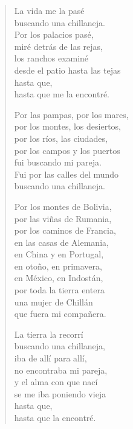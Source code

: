 \documentclass[12pt]{article}
\begin{document}
\clearpage
{}
\begin{verse}

La vida me la pasé\\
buscando una chillaneja.\\
Por los palacios pasé,\\
miré detrás de las rejas,\\
los ranchos examiné\\
desde el patio hasta las tejas\\
hasta que,\\
hasta que me la encontré.  

Por las pampas, por los mares,\\
por los montes, los desiertos,\\
por los ríos, las ciudades,\\
por los campos y los puertos\\
fui buscando mi pareja.\\
Fui por las calles del mundo\\
buscando una chillaneja.  

Por los montes de Bolivia,\\
por las viñas de Rumania,\\
por los caminos de Francia,\\
en las casas de Alemania,\\
en China y en Portugal,\\
en otoño, en primavera,\\
en México, en Indostán,\\
por toda la tierra entera\\
una mujer de Chillán\\
que fuera mi compañera.  

La tierra la recorrí\\
buscando una chillaneja,\\
iba de allí para allí,\\
no encontraba mi pareja,\\
y el alma con que nací\\
se me iba poniendo vieja\\
hasta que,\\
hasta que la encontré.  

\end{verse}
\end{document}
